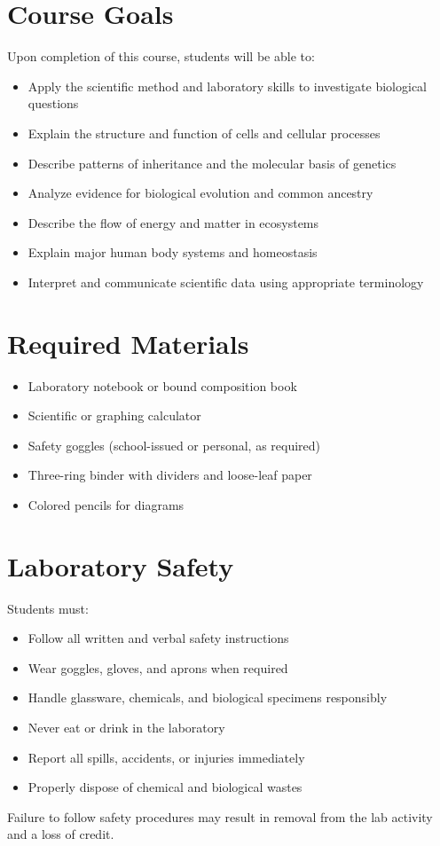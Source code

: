 \documentclass[12pt,oneside]{book}
\begin{document}
\section{Course Goals}
Upon completion of this course, students will be able to:
\begin{itemize}[leftmargin=2em]
    \item Apply the scientific method and laboratory skills to investigate biological questions
    \item Explain the structure and function of cells and cellular processes
    \item Describe patterns of inheritance and the molecular basis of genetics
    \item Analyze evidence for biological evolution and common ancestry
    \item Describe the flow of energy and matter in ecosystems
    \item Explain major human body systems and homeostasis
    \item Interpret and communicate scientific data using appropriate terminology
\end{itemize}

\section{Required Materials}
\begin{itemize}[leftmargin=2em]
    \item Laboratory notebook or bound composition book
    \item Scientific or graphing calculator
    \item Safety goggles (school-issued or personal, as required)
    \item Three-ring binder with dividers and loose-leaf paper
    \item Colored pencils for diagrams
\end{itemize}

\section{Laboratory Safety}
Students must:
\begin{itemize}[leftmargin=2em]
    \item Follow all written and verbal safety instructions
    \item Wear goggles, gloves, and aprons when required
    \item Handle glassware, chemicals, and biological specimens responsibly
    \item Never eat or drink in the laboratory
    \item Report all spills, accidents, or injuries immediately
    \item Properly dispose of chemical and biological wastes
\end{itemize}
Failure to follow safety procedures may result in removal from the lab activity and a loss of credit.
\end{document}
